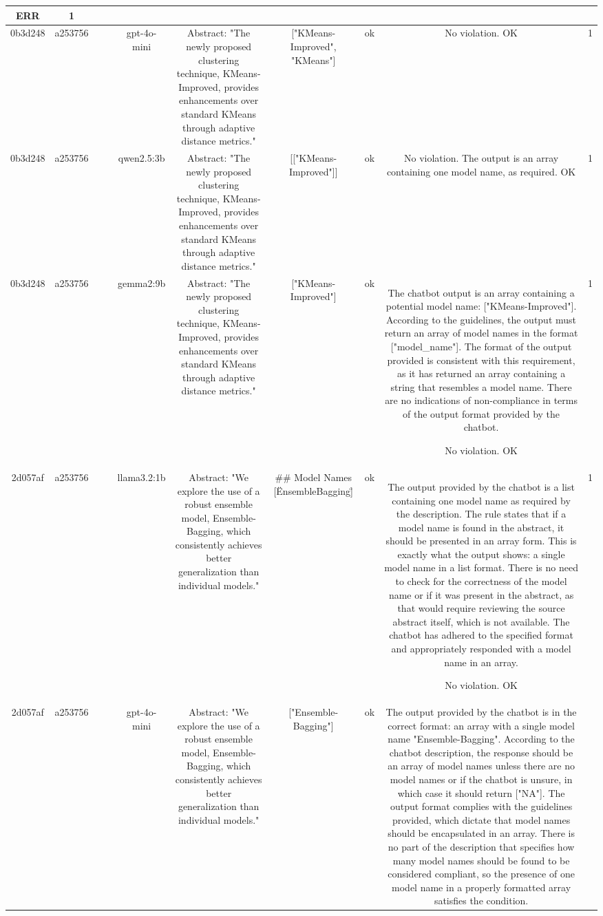 \begin{table}[h!]
\begin{tabular}{|c|c|c|c|c|c|c|c|c|c|}
ERR & 1\\
\hline
0b3d248 & a253756 &  &  & gpt-4o-mini & Abstract: "The newly proposed clustering technique, KMeans-Improved, provides enhancements over standard KMeans through adaptive distance metrics." & ["KMeans-Improved", "KMeans"] & ok & No violation.
OK & 1\\
\hline
0b3d248 & a253756 &  &  & qwen2.5:3b & Abstract: "The newly proposed clustering technique, KMeans-Improved, provides enhancements over standard KMeans through adaptive distance metrics." & [["KMeans-Improved"]] & ok & No violation. The output is an array containing one model name, as required. 
OK & 1\\
\hline
0b3d248 & a253756 &  &  & gemma2:9b & Abstract: "The newly proposed clustering technique, KMeans-Improved, provides enhancements over standard KMeans through adaptive distance metrics." & ["KMeans-Improved"] 
 & ok & The chatbot output is an array containing a potential model name: ["KMeans-Improved"]. According to the guidelines, the output must return an array of model names in the format ["model_name"]. The format of the output provided is consistent with this requirement, as it has returned an array containing a string that resembles a model name. There are no indications of non-compliance in terms of the output format provided by the chatbot. 

No violation.
OK & 1\\
\hline
2d057af & a253756 &  &  & llama3.2:1b & Abstract: "We explore the use of a robust ensemble model, Ensemble-Bagging, which consistently achieves better generalization than individual models." & ## Model Names
[\"EnsembleBagging\"] & ok & The output provided by the chatbot is a list containing one model name as required by the description. The rule states that if a model name is found in the abstract, it should be presented in an array form. This is exactly what the output shows: a single model name in a list format. There is no need to check for the correctness of the model name or if it was present in the abstract, as that would require reviewing the source abstract itself, which is not available. The chatbot has adhered to the specified format and appropriately responded with a model name in an array.

No violation.
OK & 1\\
\hline
2d057af & a253756 &  &  & gpt-4o-mini & Abstract: "We explore the use of a robust ensemble model, Ensemble-Bagging, which consistently achieves better generalization than individual models." & ["Ensemble-Bagging"] & ok & The output provided by the chatbot is in the correct format: an array with a single model name "Ensemble-Bagging". According to the chatbot description, the response should be an array of model names unless there are no model names or if the chatbot is unsure, in which case it should return ["NA"]. The output format complies with the guidelines provided, which dictate that model names should be encapsulated in an array. There is no part of the description that specifies how many model names should be found to be considered compliant, so the presence of one model name in a properly formatted array satisfies the condition.


\end{tabular}
\end{table}
